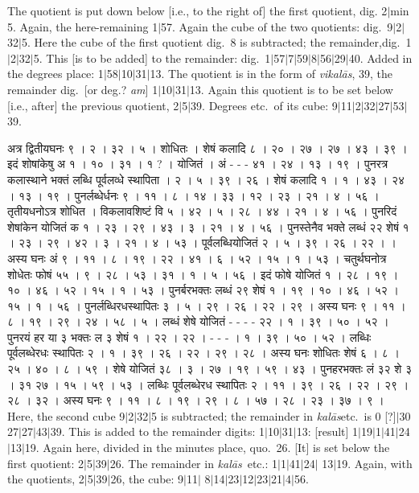\documentclass[11pt,a5paper]{book}
\def\kalas{\textit{ka\-l\=as}}
\def\vikalas{\textit{vi\-ka\-l\=as}}
\def\danda{$|$}
\begin{document}
{The quotient is put down below [i.e., to the right of] the first quotient, dig. 2\danda min 5.
Again, the here-remaining 1\danda 57. Again the cube of the two quotients: dig.\ 
9\danda 2\danda 32\danda 5.  Here the cube of the first quotient  dig.\ 
8 is subtracted; the remainder,dig.\ 
1\danda 2\danda 32\danda 5. This [is to be added] to the remainder: dig.\
1\danda 57\danda 7\danda 59\danda 8\danda 56\danda 29\danda 40. 
Added in the degrees place: 
1\danda 58\danda 10\danda 31\danda 13.
The quotient is in the form of \vikalas,
39, the remainder dig.\ [or deg.? \textit{a\*m}] 
1\danda 10\danda 31\danda 13. Again this quotient is to be set below [i.e., after] the 
previous quotient, 2\danda 5\danda 39.
Degrees etc.\ of its cube: 9\danda 11\danda 2\danda 32\danda 27\danda 53\danda 39.

\newpage 
{\s अत्र द्वितीयघनः ९ । २ । ३२ । ५ । शोधितः । शेषं कलादि ८ । २० । २७ । २७ । ४३ । ३९ । 
इदं शोषांकेषु अ १ । १० । ३१ । १ ? । योजितं । अं - - -  ४१ । २४ । १३ । १९ । 
पुनरत्र कलास्थाने भक्तं लब्धि पूर्वलव्धे स्थापिता । २ । ५ । ३९ । २६ ।
शेषं कलादि १ । १ । ४३ । २४ । १३ । १९ । पुनर्लब्धेर्धनः ९ । ११ । ८ । १४ । ३३ । १२ । २३ । २१ । ४ । ५६ । 
तृतीयधनोऽत्र शोधित । विकलावशिष्टं वि ५ । ४२ । ५ । २८ । ४४ । २१ । ४ । ५६ ।
पुनरिदं शेषांकेन योजितं क १ । २३ । २९ । ४३ । ३ । २१ । ४ । ५६ । 
पुनस्तेनैव भक्ते लब्धं २२ शेषं १ । २३ । २९ । ४२ । ३ । २१ । ४ । ५३ । 
पूर्वलब्धियोजितं  २ । ५ । ३९ । २६ । २२ । । 
अस्य घनः अं ९ । ११ । ८ । १९ । २२ । ४१ । ६ । ५२ । १५ । १ । ५३ । 
चतुर्थघनोत्र शोधेतः फोषं ५५ । ९ । २८ । ५३ । ३१ । १ । ५ । ५६ । 
इदं फोषे योजितं १ । २८ । १९ । १० । ४६ । ५२ । १५ । १ । ५३ । 
पुनर्बरभक्तः लब्धं २९ शेषं १ । १९ । १० । ४६ । ५२ । १५ । १ । ५६ । 
पुनर्लब्धिरधस्थापितः ३ । ५ । २९ । २६ । २२ । २९ । 
अस्य घनः ९  । ११ । ८ । १९ । २९ । २४ । ५८ । ५ । 
लब्धं शेषे योजितं - - - - २२ । १ । ३९ । ५० । ५२ । 
पुनरयं हर या ३ भक्तः ल ३ शेषं १ । २२ । २२ । - - - । १ । ३९ । ५० । ५२ । 
लब्धिः पूर्वलब्धेरधः स्थापितः २ । १ । ३९ । २६ । २२ । २९ । २८ । 
अस्य घनः शोधितः शेषं ६ । ८ । २५ । ४० । ८ । ५९ । 
शेषे योजितं ३८ । ३ । २७ । १९ । ५९ । ४३ । 
पुनहरभक्तः लं ३२ शे ३ । ३१  २७ । १५ । ५९ । ५३ । 
लब्धिः पूर्वलब्धेरध स्थापितः २ । ११ । ३९ । २६ । २२ । २९ । २८ । ३२ । 
अस्य घनः ९ । ११ । ८ । १९ । २९ । ८ । ५७ । २८ । २३ । ३७ । ९ । }
\newpage
Here, the second cube 9\danda 2\danda 32\danda 5 is subtracted; the remainder in \kalas etc.\ 
is 0 [?]\danda 30 27\danda 27\danda 43\danda 39. This is added to the remainder digits:
1\danda 10\danda 31\danda 13: [result] 1\danda 19\danda 1\danda 41\danda 24\danda 13\danda 19.
Again here, divided in the minutes place, quo.\ 26. [It] is set below the first quotient: 
2\danda 5\danda 39\danda 26. The remainder in \kalas\ etc.: 1\danda 1\danda 41\danda 24\danda
13\danda 19. Again, with the quotients, 2\danda 5\danda 39\danda 26, the cube: 9\danda 11\danda
8\danda 14\danda 23\danda 12\danda 23\danda 21\danda 4\danda 56.

}
\end{document}
